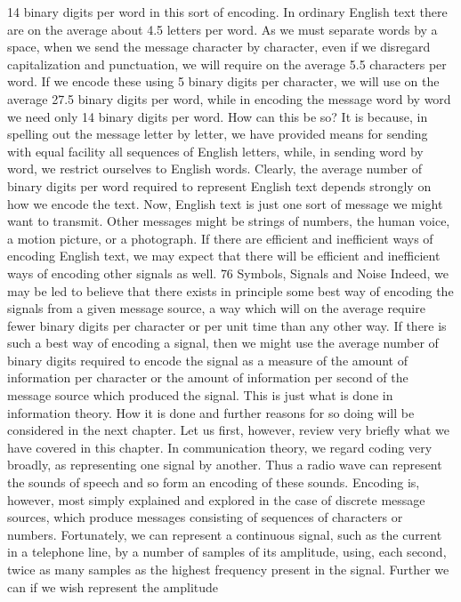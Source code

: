 14 binary digits per word in this sort of encoding. In ordinary
English text there are on the average about 4.5 letters per word.
As we must separate words by a space, when we send the message
character by character, even if we disregard capitalization and
punctuation, we will require on the average 5.5 characters per
word. If we encode these using 5 binary digits per character, we
will use on the average 27.5 binary digits per word, while in encoding
the message word by word we need only 14 binary digits
per word.
How can this be so? It is because, in spelling out the message
letter by letter, we have provided means for sending with equal
facility all sequences of English letters, while, in sending word by
word, we restrict ourselves to English words.
Clearly, the average number of binary digits per word required to
represent English text depends strongly on how we encode the text.
Now, English text is just one sort of message we might want to
transmit. Other messages might be strings of numbers, the human
voice, a motion picture, or a photograph. If there are efficient and
inefficient ways of encoding English text, we may expect that there
will be efficient and inefficient ways of encoding other signals
as well.
76 Symbols, Signals and Noise
Indeed, we may be led to believe that there exists in principle
some best way of encoding the signals from a given message source,
a way which will on the average require fewer binary digits per
character or per unit time than any other way.
If there is such a best way of encoding a signal, then we might
use the average number of binary digits required to encode the
signal as a measure of the amount of information per character or
the amount of information per second of the message source which
produced the signal.
This is just what is done in information theory. How it is done
and further reasons for so doing will be considered in the next
chapter.
Let us first, however, review very briefly what we have covered
in this chapter. In communication theory, we regard coding very
broadly, as representing one signal by another. Thus a radio wave
can represent the sounds of speech and so form an encoding of
these sounds. Encoding is, however, most simply explained and
explored in the case of discrete message sources, which produce
messages consisting of sequences of characters or numbers. Fortunately,
we can represent a continuous signal, such as the current
in a telephone line, by a number of samples of its amplitude, using,
each second, twice as many samples as the highest frequency
present in the signal. Further we can if we wish represent the amplitude
